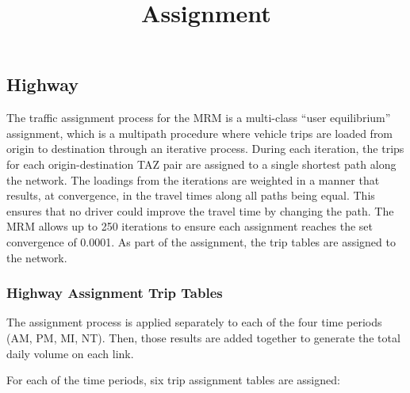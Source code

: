 \documentclass[
]{article}
\title{Assignment}
\author{}
\date{\vspace{-2.5em}}
\begin{document}
\maketitle

{
\setcounter{tocdepth}{4}
\tableofcontents
}
\subsection{Highway}\label{highway}

The traffic assignment process for the MRM is a multi-class ``user
equilibrium'' assignment, which is a multipath procedure where vehicle
trips are loaded from origin to destination through an iterative
process. During each iteration, the trips for each origin-destination
TAZ pair are assigned to a single shortest path along the network. The
loadings from the iterations are weighted in a manner that results, at
convergence, in the travel times along all paths being equal. This
ensures that no driver could improve the travel time by changing the
path. The MRM allows up to 250 iterations to ensure each assignment
reaches the set convergence of 0.0001. As part of the assignment, the
trip tables are assigned to the network.

\subsubsection{Highway Assignment Trip
Tables}\label{highway-assignment-trip-tables}

The assignment process is applied separately to each of the four time
periods (AM, PM, MI, NT). Then, those results are added together to
generate the total daily volume on each link.

For each of the time periods, six trip assignment tables are assigned:
\end{document}
